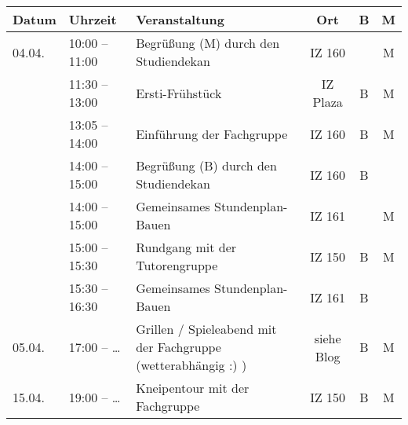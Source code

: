 
\begin{tabular}{|l|l|p{6.7cm}|c|c|c|}
\hline \textbf{Datum} & \textbf{Uhrzeit} & \textbf{Veranstaltung}	& \textbf{Ort} & \textbf{B} & \textbf{M} \\
\hline 04.04.  	& 10:00 – 11:00	 & Begrüßung (M) \newline durch den Studiendekan	& IZ 160	& &M\\
\hline 	& 11:30 – 13:00	 & Ersti-Frühstück									& IZ Plaza		&B&M\\
\hline 			& 13:05 – 14:00	 & Einführung  der Fachgruppe					& IZ 160		&B&M\\
\hline 			& 14:00 – 15:00	 & Begrüßung (B) \newline durch den Studiendekan	& IZ 160	&B& \\
\hline 			& 14:00 – 15:00	 & Gemeinsames Stundenplan-Bauen					& IZ 161		& &M\\
%
%
\hline 			& 15:00 – 15:30	 & Rundgang  \newline mit der Tutorengruppe		& IZ 150		&B&M \\
\hline 			& 15:30 – 16:30	 & Gemeinsames Stundenplan-Bauen					& IZ 161		& B&\\
\hline 	05.04.		& 17:00 – \ldots & Grillen / Spieleabend  mit
der Fachgruppe (wetterabhängig :) )
& siehe Blog		&B&M\\
\hline 15.04.	& 19:00 – \ldots & Kneipentour mit der Fachgruppe					& IZ 150		&B&M\\
\hline
\end{tabular} 
